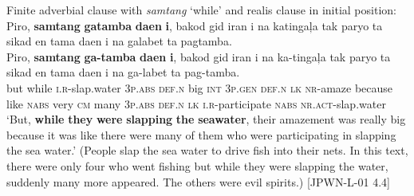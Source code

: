 \ea
Finite adverbial clause with \textit{samtang} ‘while’ and realis clause in initial position: \\
Piro,  \textbf{samtang}  \textbf{gatamba}  \textbf{daen}  \textbf{i},  bakod  gid  iran  i  na katingaļa  tak  paryo  ta  sikad  en  tama  daen  i na  galabet  ta  pagtamba. \smallskip\\
\gll Piro,  \textbf{samtang}  \textbf{ga-tamba}  \textbf{daen}  \textbf{i},  bakod  gid  iran  i  na ka-tingaļa  tak  paryo  ta  sikad  en  tama  daen  i na  ga-labet  ta  pag-tamba. \\
but  while  \textsc{i.r}-slap.water  3\textsc{p.abs}  \textsc{def.n}  big  \textsc{int}  3\textsc{p.gen}  \textsc{def.n}  \textsc{lk}
\textsc{nr}-amaze  because  like  \textsc{nabs}  very  \textsc{cm}  many  3\textsc{p.abs}  \textsc{def.n}
\textsc{lk}  \textsc{i.r}-participate  \textsc{nabs}  \textsc{nr.act}-slap.water \\
\glt ‘But, \textbf{while} \textbf{they} \textbf{were} \textbf{slapping} \textbf{the} \textbf{seawater}, their amazement was really big because it was like there were many of them who were participating in slapping the sea water.’ (People slap the sea water to drive fish into their nets. In this text, there were only four who went fishing but while they were slapping the water, suddenly many more appeared. The others were evil spirits.) [JPWN-L-01 4.4]
\z

